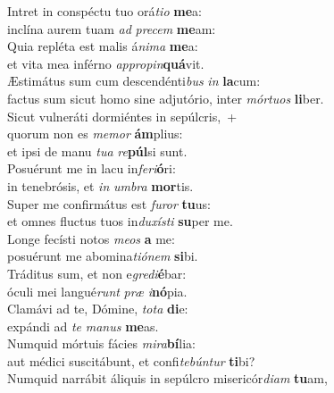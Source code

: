 \evenverse Intret in conspéctu tuo orá\textit{ti}\textit{o} \textbf{me}a:~\*\\
\evenverse inclína aurem tuam \textit{ad} \textit{pre}\textit{cem} \textbf{me}am:\\
\oddverse Quia repléta est malis á\textit{ni}\textit{ma} \textbf{me}a:~\*\\
\oddverse et vita mea inférno \textit{ap}\textit{pro}\textit{pin}\textbf{quá}vit.\\
\evenverse Æstimátus sum cum descendénti\textit{bus} \textit{in} \textbf{la}cum:~\*\\
\evenverse factus sum sicut homo sine adjutório, inter \textit{mór}\textit{tu}\textit{os} \textbf{li}ber.\\
\oddverse Sicut vulneráti dormiéntes in sepúlcris,~+\\
\oddverse  quorum non es \textit{me}\textit{mor} \textbf{ám}plius:~\*\\
\oddverse et ipsi de manu \textit{tu}\textit{a} \textit{re}\textbf{púl}si sunt.\\
\evenverse Posuérunt me in lacu in\textit{fe}\textit{ri}\textbf{ó}ri:~\*\\
\evenverse in tenebrósis, et \textit{in} \textit{um}\textit{bra} \textbf{mor}tis.\\
\oddverse Super me confirmátus est \textit{fu}\textit{ror} \textbf{tu}us:~\*\\
\oddverse et omnes fluctus tuos in\textit{du}\textit{xí}\textit{sti} \textbf{su}per me.\\
\evenverse Longe fecísti notos \textit{me}\textit{os} \textbf{a} me:~\*\\
\evenverse posuérunt me abomina\textit{ti}\textit{ó}\textit{nem} \textbf{si}bi.\\
\oddverse Tráditus sum, et non e\textit{gre}\textit{di}\textbf{é}bar:~\*\\
\oddverse óculi mei langué\textit{runt} \textit{præ} \textit{i}\textbf{nó}pia.\\
\evenverse Clamávi ad te, Dómine, \textit{to}\textit{ta} \textbf{di}e:~\*\\
\evenverse expándi ad \textit{te} \textit{ma}\textit{nus} \textbf{me}as.\\
\oddverse Numquid mórtuis fácies \textit{mi}\textit{ra}\textbf{bí}lia:~\*\\
\oddverse aut médici suscitábunt, et confi\textit{te}\textit{bún}\textit{tur} \textbf{ti}bi?\\
\evenverse Numquid narrábit áliquis in sepúlcro misericór\textit{di}\textit{am} \textbf{tu}am,~\*\\
